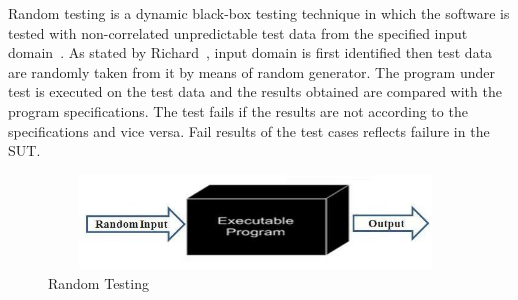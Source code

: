 
Random testing is a dynamic black-box testing technique in which the software is tested with non-correlated unpredictable test data from the specified input domain~\cite{chan2003normalized}. As stated by Richard~\cite{hamlet1994random}, input domain is first identified then test data are randomly taken from it by means of random generator. The program under test is executed on the test data and the results obtained are compared with the program specifications. The test fails if the results are not according to the specifications and vice versa. Fail results of the test cases reflects failure in the SUT.

\begin{figure}[h]
	\centering
	\includegraphics[width=11cm, height=2.5cm ]{chapter2/randomTesting.jpg}
	\caption{Random Testing}
\end{figure}



